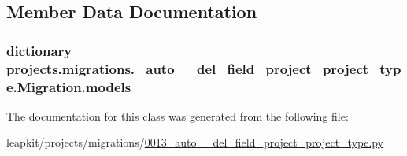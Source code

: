 \subsection{Member Data Documentation}
\hypertarget{classprojects_1_1migrations_1_10013__auto____del__field__project__project__type_1_1_migration_a79f66b25c2b91e23267010f67812f47d}{
\subsubsection[{models}]{\setlength{\rightskip}{0pt plus 5cm}dictionary projects.\-migrations.\-\_\-auto\-\_\-\-\_\-del\-\_\-field\-\_\-project\-\_\-project\-\_\-type.\-Migration.\-models\hspace{0.3cm}{\ttfamily [static]}}}\label{classprojects_1_1migrations_1_10013__auto____del__field__project__project__type_1_1_migration_a79f66b25c2b91e23267010f67812f47d}


The documentation for this class was generated from the following file\-:\begin{DoxyCompactItemize}
\item 
leapkit/projects/migrations/\hyperlink{0013__auto____del__field__project__project__type_8py}{0013\-\_\-auto\-\_\-\-\_\-del\-\_\-field\-\_\-project\-\_\-project\-\_\-type.\-py}\end{DoxyCompactItemize}
